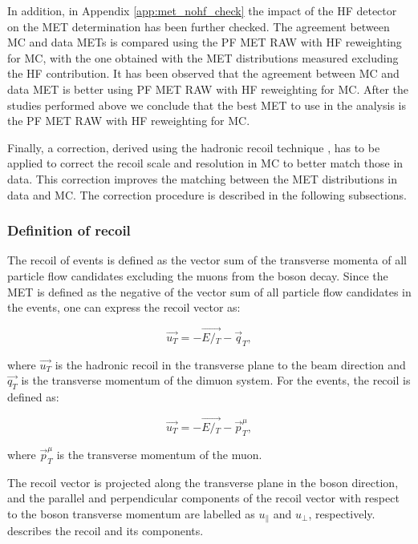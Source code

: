 In addition, in Appendix \ref{app:met_nohf_check} the impact of the HF detector on the MET determination has been further checked. The agreement between MC and data METs is compared using the PF MET RAW with HF reweighting for MC, with the one obtained with the MET distributions measured excluding the HF contribution. It has been observed that the agreement between MC and data MET is better using PF MET RAW with HF reweighting for MC. After the studies performed above we conclude that the best MET to use in the analysis is the PF MET RAW with HF reweighting for MC. 

Finally, a correction, derived using the hadronic recoil technique \cite{MET_Recoil}, has to be applied to correct the recoil scale and resolution in MC to better match those in data. This correction improves the matching between the MET distributions in data and MC. The correction procedure is described in the following subsections.


\subsubsection{Definition of recoil} \label{sec:WBoson_Analysis_RecoilCorrection}

The recoil of \ZToMuMu events is defined as the vector sum of the transverse momenta of all particle flow candidates excluding the muons from the boson decay. Since the MET is defined as the negative of the vector sum of all particle flow candidates in the events, one can express the recoil vector as:

\begin{equation}\label{eq:equT} 
\vec{u_{T}} = -\vec{E\!\!\!/{_T}} - \vec{q}_{T},
\end{equation}

where $\vec{u_{T}}$ is the hadronic recoil in the transverse plane to the beam direction and $\vec{q_{T}}$ is the transverse momentum of the dimuon system. For the \WToMuNu events, the recoil is defined as:

\begin{equation}\label{eq:equTW}
\vec{u_{T}} = -\vec{E\!\!\!/{_T}} - \vec{p}_{T}^{\mu},
\end{equation}

where $\vec{p}_{T}^{\mu}$ is the transverse momentum of the muon.

The recoil vector is projected along the transverse plane in the boson direction, and the parallel and perpendicular components of the recoil vector with respect to the boson transverse momentum are labelled as $u_{\parallel}$ and $u_{\perp}$, respectively.  describes the recoil and its components.

